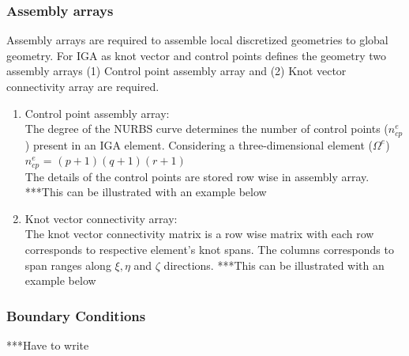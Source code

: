 \documentclass[12pt]{article}
\begin{document}
\subsubsection{Assembly arrays}
Assembly arrays are required to assemble local discretized geometries to global geometry. For IGA as knot vector and control points defines the geometry two assembly arrays (1) Control point assembly array and (2) Knot vector connectivity array are required.
\begin{enumerate}[leftmargin=*]
	\item Control point assembly array: \\
	The degree of the NURBS curve determines the number of control points ($n^e_{cp}$) present in an IGA element.
	Considering a three-dimensional element ($\Omega^e$)\\
	$n^e_{cp}$ = $(p+1)(q+1)(r+1)$ \\
	The details of the control points are stored row wise in assembly array.
	***This can be illustrated with an example below
	\item Knot vector connectivity array: \\
	The knot vector connectivity matrix is a row wise matrix with each row corresponds to respective element's knot spans. The columns corresponds to span ranges along $\xi, \eta$ and $\zeta$ directions.
	***This can be illustrated with an example below
\end{enumerate}
\subsubsection{Boundary Conditions}
***Have to write 
\end{document}
